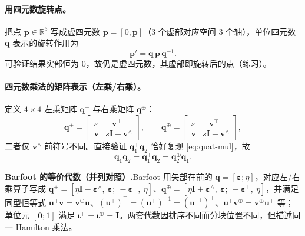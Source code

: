 \paragraph{用四元数旋转点。}把点 $\mathbf{p}\in\mathbb{R}^3$ 写成虚四元数 $\mathbf{p}=[0,\mathbf{p}]$（$3$ 个虚部对应空间 $3$ 个轴），单位四元数 $\mathbf{q}$ 表示的旋转作用为
\begin{equation}
  \mathbf{p}'=\mathbf{q}\,\mathbf{p}\,\mathbf{q}^{-1}.
  \label{eq:quat-rot}
\end{equation}
可验证结果实部恒为 $0$，故仍是虚四元数，其虚部即旋转后的点（练习）。

\paragraph{四元数乘法的矩阵表示（左乘/右乘）。}定义 $4\times4$ 左乘矩阵 $\mathbf{q}^{+}$ 与右乘矩阵 $\mathbf{q}^{\oplus}$\cite{gaoxiang2019slam14}：
\begin{equation}
  \mathbf{q}^{+}=\begin{bmatrix}s&-\mathbf{v}^\top\\\mathbf{v}&s\mathbf{I}+\mathbf{v}^\wedge\end{bmatrix},\qquad
  \mathbf{q}^{\oplus}=\begin{bmatrix}s&-\mathbf{v}^\top\\\mathbf{v}&s\mathbf{I}-\mathbf{v}^\wedge\end{bmatrix},
  \label{eq:rb-quat-lr}
\end{equation}
二者仅 $\mathbf{v}^\wedge$ 前符号不同。直接验证 $\mathbf{q}_1^{+}\mathbf{q}_2$ 恰好复现 \cref{eq:quat-mul}，故
\begin{equation}
  \mathbf{q}_1\mathbf{q}_2=\mathbf{q}_1^{+}\mathbf{q}_2=\mathbf{q}_2^{\oplus}\mathbf{q}_1.
  \label{eq:rb-quat-lr-eq}
\end{equation}
\begin{note}
\textbf{Barfoot 的等价代数（并列对照）.}\;Barfoot 用矢部在前的 $\mathbf{q}=[\boldsymbol{\varepsilon};\eta]$，对应左/右乘算子写成 $\mathbf{q}^{+}=[\eta\mathbf{I}-\boldsymbol{\varepsilon}^\wedge,\ \boldsymbol{\varepsilon};\ -\boldsymbol{\varepsilon}^\top,\ \eta]$、$\mathbf{q}^{\oplus}=[\eta\mathbf{I}+\boldsymbol{\varepsilon}^\wedge,\ \boldsymbol{\varepsilon};\ -\boldsymbol{\varepsilon}^\top,\ \eta]$，并满足同型恒等式 $\mathbf{u}^{+}\mathbf{v}=\mathbf{v}^{\oplus}\mathbf{u}$、$(\mathbf{u}^{+})^\top=(\mathbf{u}^{+})^{-1}=(\mathbf{u}^{-1})^{+}$、$\mathbf{u}^{+}\mathbf{v}^{\oplus}=\mathbf{v}^{\oplus}\mathbf{u}^{+}$ 等；单位元 $[\mathbf{0};1]$ 满足 $\boldsymbol{\iota}^{+}=\boldsymbol{\iota}^{\oplus}=\mathbf{I}$。两套代数因排序不同而分块位置不同，但描述同一 Hamilton 乘法\cite{barfoot2024state}。
\end{note}

